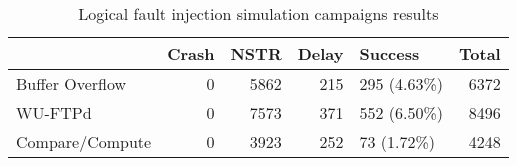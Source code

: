 \begin{table}[H]
\centering
\caption{Logical fault injection simulation campaigns results}
\label{table:end_sim_by_status_multi_bitflip_reg}
\begin{tabular}{lrrrlr}
\toprule
 & Crash & NSTR & Delay & Success & Total \\
\midrule
Buffer Overflow & 0 & 5862 & 215 & 295 (4.63\%) & 6372 \\
WU-FTPd & 0 & 7573 & 371 & 552 (6.50\%) & 8496 \\
Compare/Compute & 0 & 3923 & 252 & 73 (1.72\%) & 4248 \\
\bottomrule
\end{tabular}
\end{table}
